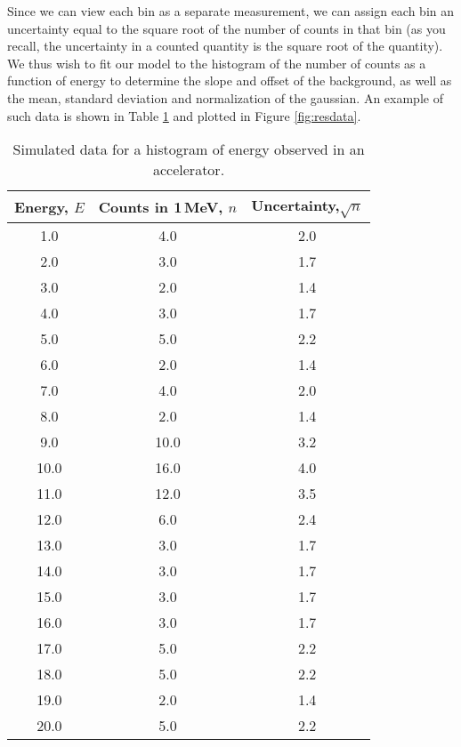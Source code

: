 Since we can view each bin as a separate measurement, we can assign each bin an uncertainty equal to the square root of the number of counts in that bin (as you recall, the uncertainty in a counted quantity is the square root of the quantity). We thus wish to fit our model to the histogram of the number of counts as a function of energy to determine the slope and offset of the background, as well as the mean, standard deviation and normalization of the gaussian. An example of such data is shown in Table \ref{tab:resdata} and plotted in Figure \ref{fig:resdata}.

\begin{table}[h!]
\center
\begin{tabular}{|c|c|c|}
\hline
\textbf{Energy, $E$}&\textbf{Counts in 1\,MeV, $n$}&\textbf{Uncertainty,$\sqrt{n}$}\\
\hline
1.0 & 4.0 & 2.0\\
\hline
2.0 & 3.0 & 1.7\\
\hline
3.0 & 2.0 & 1.4\\
\hline
4.0 & 3.0 & 1.7\\
\hline
5.0 & 5.0 & 2.2\\
\hline
6.0 & 2.0 & 1.4\\
\hline
7.0 & 4.0 & 2.0\\
\hline
8.0 & 2.0 & 1.4\\
\hline
9.0 & 10.0 & 3.2\\
\hline
10.0 & 16.0 & 4.0\\
\hline
11.0 & 12.0 & 3.5\\
\hline
12.0 & 6.0 & 2.4\\
\hline
13.0 & 3.0 & 1.7\\
\hline
14.0 & 3.0 & 1.7\\
\hline
15.0 & 3.0 & 1.7\\
\hline
16.0 & 3.0 & 1.7\\
\hline
17.0 & 5.0 & 2.2\\
\hline
18.0 & 5.0 & 2.2\\
\hline
19.0 & 2.0 & 1.4\\
\hline
20.0 & 5.0 & 2.2\\
\hline
\end{tabular}
\caption{\label{tab:resdata} Simulated data for a histogram of energy observed in an accelerator.}
\end{table}


